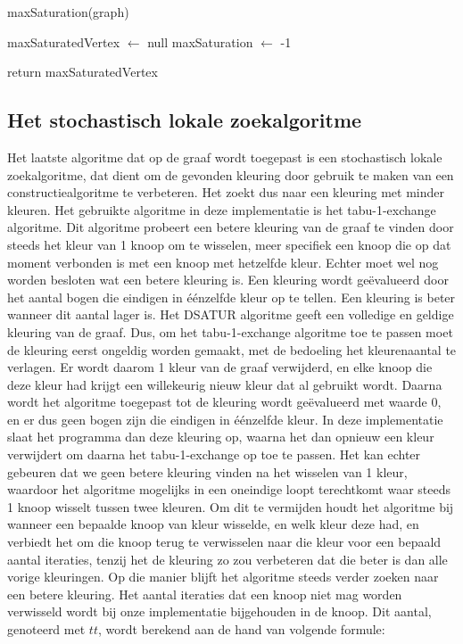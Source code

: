 \documentclass[a4paper,kulak]{kulakarticle} %
\begin{document}
\begin{function}
	\caption{maxSaturation(graph)}\label{func:maxSaturation}
	
	maxSaturatedVertex $\gets$ null\;
	maxSaturation $\gets$ -1\;
	
	return maxSaturatedVertex\;
\end{function}

\subsection{Het stochastisch lokale zoekalgoritme}

Het laatste algoritme dat op de graaf wordt toegepast is een stochastisch lokale zoekalgoritme, dat dient om de gevonden kleuring door gebruik te maken van een constructiealgoritme te verbeteren. Het zoekt dus naar een kleuring met minder kleuren. 
Het gebruikte algoritme in deze implementatie is het tabu-1-exchange algoritme. Dit algoritme probeert een betere kleuring van de graaf te vinden door steeds het kleur van 1 knoop om te wisselen, meer specifiek een knoop die op dat moment verbonden is met een knoop met hetzelfde kleur. Echter moet wel nog worden besloten wat een betere kleuring is. Een kleuring wordt geëvalueerd door het aantal bogen die eindigen in éénzelfde kleur op te tellen. Een kleuring is beter wanneer dit aantal lager is. 
Het DSATUR algoritme geeft een volledige en geldige kleuring van de graaf. Dus, om het tabu-1-exchange algoritme toe te passen moet de kleuring eerst ongeldig worden gemaakt, met de bedoeling het kleurenaantal te verlagen. Er wordt daarom 1 kleur van de graaf verwijderd, en elke knoop die deze kleur had krijgt een willekeurig nieuw kleur dat al gebruikt wordt. Daarna wordt het algoritme toegepast tot de kleuring wordt geëvalueerd met waarde 0, en er dus geen bogen zijn die eindigen in éénzelfde kleur. In deze implementatie slaat het programma dan deze kleuring op, waarna het dan opnieuw een kleur verwijdert om daarna het tabu-1-exchange op toe te passen.
Het kan echter gebeuren dat we geen betere kleuring vinden na het wisselen van 1 kleur, waardoor het algoritme mogelijks in een oneindige loopt terechtkomt waar steeds 1 knoop wisselt tussen twee kleuren. Om dit te vermijden houdt het algoritme bij wanneer een bepaalde knoop van kleur wisselde, en welk kleur deze had, en verbiedt het om die knoop terug te verwisselen naar die kleur voor een bepaald aantal iteraties, tenzij het de kleuring zo zou verbeteren dat die beter is dan alle vorige kleuringen. Op die manier blijft het algoritme steeds verder zoeken naar een betere kleuring.
Het aantal iteraties dat een knoop niet mag worden verwisseld wordt bij onze implementatie bijgehouden in de knoop. Dit aantal, genoteerd met $tt$, wordt berekend aan de hand van volgende formule:
\end{document}
